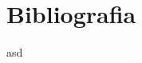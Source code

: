 \documentclass[Tesi.tex]{subfiles}
\begin{document}
\renewcommand{\leftmark}{Bibliografia}

\chapter*{Bibliografia}
asd
\end{document}
